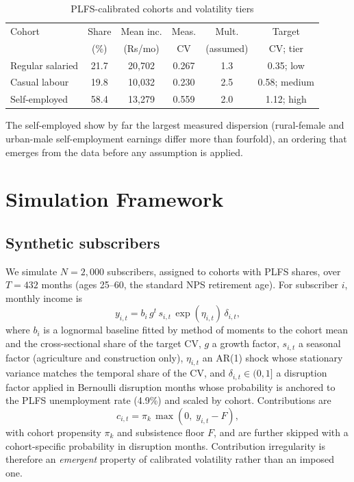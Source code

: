 \documentclass[conference]{IEEEtran}
\begin{document}
\begin{table}[!htbp]
\centering
\caption{PLFS-calibrated cohorts and volatility tiers}
\label{tab:calib}
\begin{tabular}{lccccc}
\hline
Cohort & Share & Mean inc. & Meas. & Mult. & Target \\
 & (\%) & (Rs/mo) & CV & (assumed) & CV; tier \\
\hline
Regular salaried & 21.7 & 20,702 & 0.267 & 1.3 & 0.35; low \\
Casual labour & 19.8 & 10,032 & 0.230 & 2.5 & 0.58; medium \\
Self-employed & 58.4 & 13,279 & 0.559 & 2.0 & 1.12; high \\
\hline
\end{tabular}
\end{table}

The self-employed show by far the largest measured dispersion (rural-female and urban-male self-employment earnings differ more than fourfold), an ordering that emerges from the data before any assumption is applied.

\section{Simulation Framework}
\subsection{Synthetic subscribers}
We simulate $N=2{,}000$ subscribers, assigned to cohorts with PLFS shares, over $T=432$ months (ages 25--60, the standard NPS retirement age). For subscriber $i$, monthly income is
\begin{equation}
y_{i,t}=b_i\,g^{t}\,s_{i,t}\,\exp(\eta_{i,t})\,\delta_{i,t},
\end{equation}
where $b_i$ is a lognormal baseline fitted by method of moments to the cohort mean and the cross-sectional share of the target CV, $g$ a growth factor, $s_{i,t}$ a seasonal factor (agriculture and construction only), $\eta_{i,t}$ an AR(1) shock whose stationary variance matches the temporal share of the CV, and $\delta_{i,t}\in(0,1]$ a disruption factor applied in Bernoulli disruption months whose probability is anchored to the PLFS unemployment rate (4.9\%) and scaled by cohort. Contributions are
\begin{equation}
c_{i,t}=\pi_k\,\max(0,\;y_{i,t}-F),
\end{equation}
with cohort propensity $\pi_k$ and subsistence floor $F$, and are further skipped with a cohort-specific probability in disruption months. Contribution irregularity is therefore an \emph{emergent} property of calibrated volatility rather than an imposed one.
\end{document}
